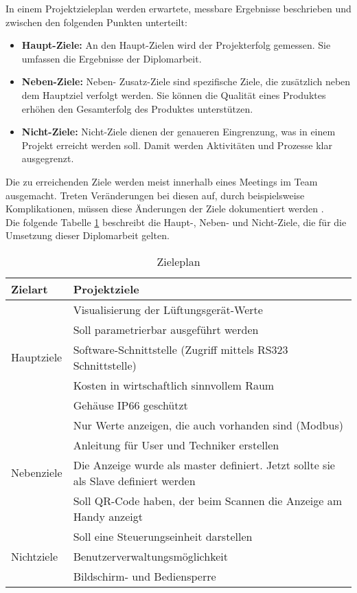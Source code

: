 In einem Projektzieleplan werden erwartete, messbare Ergebnisse beschrieben und zwischen den folgenden Punkten unterteilt:
\begin{itemize}
	\item \textbf{Haupt-Ziele:} An den Haupt-Zielen wird der  Projekterfolg gemessen. Sie umfassen die Ergebnisse der Diplomarbeit.
	\item \textbf{Neben-Ziele:} Neben- \bzw Zusatz-Ziele sind spezifische Ziele, die zusätzlich neben dem Hauptziel verfolgt werden. Sie können die Qualität eines Produktes erhöhen \bzw den Gesamterfolg des Produktes unterstützen.
	\item \textbf{Nicht-Ziele:} Nicht-Ziele dienen der genaueren Eingrenzung, was in einem Projekt erreicht werden soll. Damit werden Aktivitäten und Prozesse klar ausgegrenzt.
\end{itemize}
Die zu erreichenden Ziele werden meist innerhalb eines Meetings im Team ausgemacht. Treten Veränderungen bei diesen auf, durch beispielsweise Komplikationen, müssen diese Änderungen der Ziele dokumentiert werden \cite[vgl.][]{Diplomarbeiten-bbs:o.J.}. \\ 
Die folgende Tabelle \ref{tab:ziele_plan} beschreibt die Haupt-, Neben- und Nicht-Ziele, die für die Umsetzung dieser Diplomarbeit gelten.
\begin{table}[htpb]
	\caption{Zieleplan}
	\label{tab:ziele_plan}
	\begin{tabular}{p{} | p{}}
		\toprule
		\textbf{Zielart} & \textbf{Projektziele} \\
		\midrule
		& Visualisierung der Lüftungsgerät-Werte
		\\
		& Soll parametrierbar ausgeführt werden
		\\
		Hauptziele & Software-Schnittstelle (Zugriff mittels RS323 Schnittstelle)
		\\
		& Kosten in wirtschaftlich sinnvollem Raum
		\\
		& Gehäuse IP66 geschützt 
		\\
		\midrule
		& Nur Werte anzeigen, die auch vorhanden sind (Modbus)
		\\
		& Anleitung für User und Techniker erstellen
		\\
		Nebenziele & Die Anzeige wurde als master definiert. Jetzt sollte sie als Slave definiert werden
		\\
		& Soll QR-Code haben, der beim Scannen die Anzeige am Handy anzeigt
		\\
		\midrule
		& Soll eine Steuerungseinheit darstellen
		\\
		Nichtziele & Benutzerverwaltungsmöglichkeit
		\\
		& Bildschirm- und Bediensperre
		\\
		\bottomrule
	\end{tabular}
\end{table}